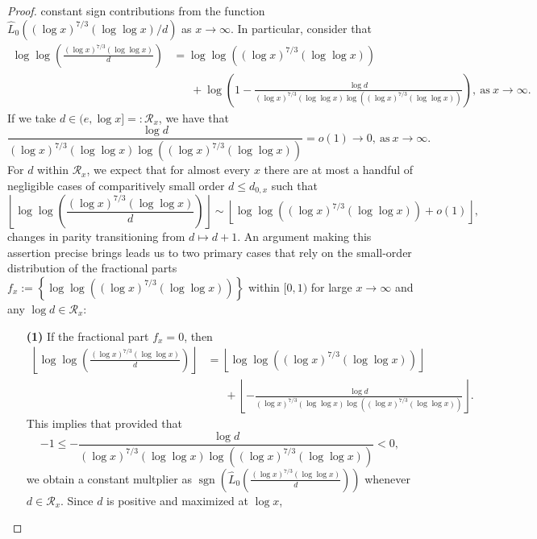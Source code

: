 \documentclass[11pt,reqno,a4letter]{article}
\numberwithin{figure}{section}
\numberwithin{table}{section}
\newcommand{\floor}[1]{\left\lfloor #1 \right\rfloor}
\theoremstyle{plain}
\numberwithin{theorem}{section}
\theoremstyle{definition}
\begin{document}
\begin{proof}
constant sign contributions from the 
function $\widehat{L}_0((\log x)^{7/3} (\log\log x) / d)$ as $x \rightarrow \infty$. 
In particular, consider that 
\begin{align*} 
\log\log\left(\frac{(\log x)^{7/3} (\log\log x)}{d}\right) & = 
     \log\log\left((\log x)^{7/3} (\log\log x)\right) \\ 
     & \phantom{=\ } + \log\left(1 - 
     \frac{\log d}{(\log x)^{7/3} (\log\log x) \log\left( 
     (\log x)^{7/3} (\log\log x)\right)}\right), 
     \mathrm{\ as\ } x \rightarrow \infty. 
\end{align*} 
If we take $d \in (e, \log x] =: \mathcal{R}_x$, we have that 
$$\frac{\log d}{(\log x)^{7/3} (\log\log x) \log\left( 
 (\log x)^{7/3} (\log\log x)\right)} = o(1) \rightarrow 0, \mathrm{\ as\ } 
 x \rightarrow \infty.$$  
For $d$ within $\mathcal{R}_x$, 
we expect that for almost every $x$ there are at most 
a handful of negligible cases of comparitively small order 
$d \leq d_{0,x}$ such that 
\[
\floor{\log\log\left(\frac{(\log x)^{7/3} (\log\log x)}{d}\right)} \sim 
     \floor{\log\log\left((\log x)^{7/3} (\log\log x)\right) + o(1)}, 
\]
changes in parity transitioning from $d \mapsto d+1$. 
An argument making this assertion precise brings leads us to 
two primary cases that rely on the small-order distribution of the fractional parts 
$f_x := \left\{\log\log\left((\log x)^{7/3} (\log\log x)\right)\right\}$ within $[0, 1)$ for 
large $x \rightarrow \infty$ and any $\log d \in \mathcal{R}_x$: 
\begin{itemize}[itemsep=0pt,topsep=0pt,leftmargin=0.35in] 
\item[\textbf{(1)}] If the fractional part 
     $f_x = 0$, then 
     \begin{align*} 
     \floor{\log\log\left(\frac{(\log x)^{7/3} (\log\log x)}{d}\right)} & = 
          \floor{\log\log\left((\log x)^{7/3} (\log\log x)\right)} \\ 
          & \phantom{=\ } + 
          \floor{-\frac{\log d}{(\log x)^{7/3} (\log\log x) \log\left( 
          (\log x)^{7/3} (\log\log x)\right)}}. 
     \end{align*} 
     This implies that provided that 
     \[
     -1 \leq -\frac{\log d}{(\log x)^{7/3} (\log\log x) \log\left( 
          (\log x)^{7/3} (\log\log x)\right)} < 0, 
     \]
     we obtain a constant multplier as 
     $\operatorname{sgn}\left(\widehat{L}_0\left(\frac{(\log x)^{7/3} (\log\log x)}{d}\right)\right)$ 
     whenever $d \in \mathcal{R}_x$. 
     Since $d$ is positive and maximized at $\log x$, 

\end{itemize}
\end{proof}
\end{document}
